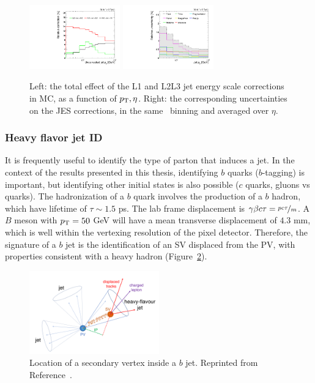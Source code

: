 \begin{figure}[]
\begin{center}
    \includegraphics[width=0.35\textwidth]{figures/cms/jec_jotjotRawPt.pdf}
    \includegraphics[width=0.35\textwidth]{figures/cms/var_jotjotPt.pdf}
    \caption{Left: the total effect of the L1 and L2L3 jet energy scale corrections in MC, as a function of $p_\mathrm{T},\eta$.
             Right: the corresponding uncertainties on the JES corrections, in the same \pt~binning and averaged over $\eta$.}
    \label{fig:cms:jec}
\end{center}
\end{figure}

\subsubsection{Heavy flavor jet ID}

It is frequently useful to identify the type of parton that induces a jet.
In the context of the results presented in this thesis, identifying $b$ quarks ($b$-tagging) is important, but identifying other initial states is also possible ($c$ quarks, gluons vs quarks). 
The hadronization of a $b$ quark involves the production of a $b$ hadron, which have lifetime of $\tau\sim 1.5$ ps. 
The lab frame displacement is $\gamma\beta c\tau = \nicefrac{pc\tau}{m}$.
A $B$ meson with $p_\mathrm{T}=50$ GeV will have a mean transverse displacement of $4.3$ mm, which is well within the vertexing resolution of the pixel detector.
Therefore, the signature of a $b$ jet is the identification of an SV displaced from the PV, with properties consistent with a heavy hadron (Figure~\ref{fig:cms:bjet}).

\begin{figure}[]
\begin{center}
    \includegraphics[width=0.5\textwidth]{figures/cms/bjet.png}
    \caption{Location of a secondary vertex inside a $b$ jet.
             Reprinted from Reference~\cite{csvv2}.}
    \label{fig:cms:bjet}
\end{center}
\end{figure}

